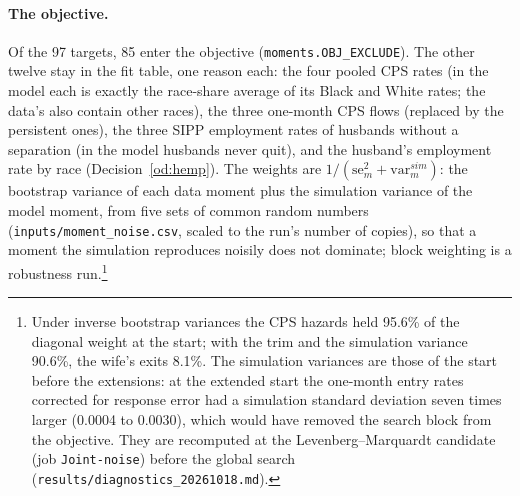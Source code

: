 \documentclass[11pt]{article}
\newcommand{\code}[1]{\texttt{#1}}
\newcommand{\1}{\mathbf{1}}
\begin{document}
\paragraph{The objective.} Of the 97 targets, 85 enter the objective (\code{moments.OBJ\_EXCLUDE}). The other twelve stay
in the fit table, one reason each: the four pooled CPS rates (in the model each is exactly the race-share average of its
Black and White rates; the data's also contain other races), the three one-month CPS flows (replaced by the persistent
ones), the three SIPP employment rates of husbands without a separation (in the model husbands never quit), and the
husband's employment rate by race (Decision~\ref{od:hemp}). The weights are $1/(\mathrm{se}_m^2 +
\mathrm{var}^{sim}_m)$: the bootstrap variance of each data moment plus the simulation variance of the model moment,
from five sets of common random numbers (\code{inputs/moment\_noise.csv}, scaled to the run's number of copies), so that
a moment the simulation reproduces noisily does not dominate; block weighting is a robustness run.\footnote{Under
inverse bootstrap variances the CPS hazards held 95.6\% of the diagonal weight at the start; with the trim and the
simulation variance 90.6\%, the wife's exits 8.1\%. The simulation variances are those of the start before the
extensions: at the extended start the one-month entry rates corrected for response error had a simulation standard
deviation seven times larger (0.0004 to 0.0030), which would have removed the search block from the objective. They
are recomputed at the Levenberg--Marquardt candidate (job \code{Joint-noise}) before the global search
(\code{results/diagnostics\_20261018.md}).}
\end{document}
